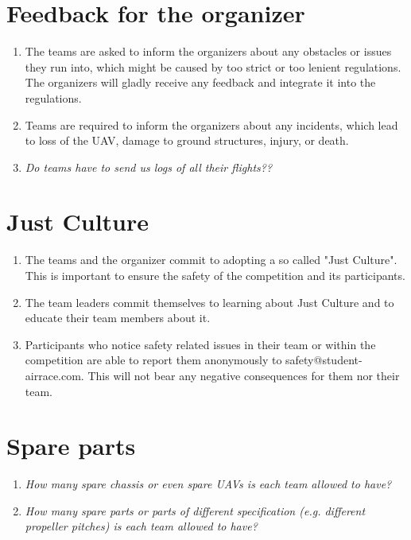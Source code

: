     \section{Feedback for the organizer}
    \begin{enumerate}
      \item The teams are asked to inform the organizers about any obstacles or issues they run into, which might be caused by
      too strict or too lenient regulations. The organizers will gladly receive any feedback and integrate it into the regulations. 
      \item Teams are required to inform the organizers about any incidents, which lead to loss of the UAV, damage to ground structures, injury, or death. 
      \item \emph{Do teams have to send us logs of all their flights??}
    \end{enumerate}

    \section{Just Culture}
    \begin{enumerate}
      \item The teams and the organizer commit to adopting a so called "Just Culture". This is important to ensure the safety of the competition and its participants.
      \item The team leaders commit themselves to learning about Just Culture and to educate their team members about it.
      \item Participants who notice safety related issues in their team or within the competition are able to report them anonymously  to safety@student-airrace.com. This will not bear any
      negative consequences for them nor their team. 
    \end{enumerate}

    \section{Spare parts}
    \begin{enumerate}
      \item \emph{How many spare chassis or even spare UAVs is each team allowed to have?}
      \item \emph{How many spare parts or parts of different specification (e.g. different propeller pitches) is each team allowed to have?}
    \end{enumerate}

